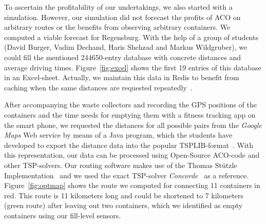 \documentclass[10pt]{article}
\begin{document}
To ascertain the profitability of our undertakings, we also started with a simulation.
However, our simulation did not forecast the profits of ACO on arbitrary routes or the
benefits from observing arbitrary containers. We computed a viable forecast for Regensburg.
With the help of a group of students (David Burger, Vadim Dechand, 
Haris Shehzad and Markus Wildgruber), we could fill the mentioned 
244650-entry database with concrete distances and average driving times. 
Figure~\ref{fig:excel} shows the first 19 entries of this database in an
Excel-sheet. Actually, we maintain this data in Redis to benefit from caching
when the same distances are requested repeatedly~\cite{Carlson13}. 

After accompanying
the waste collectors and recording the GPS positions of the containers and the time needs 
for emptying them with a fitness tracking app on the smart phone, we requested the
distances for all possible pairs from the {\it Google Maps} Web service by means of a 
Java program, which the students have developed to export the distance data into the
popular TSPLIB-format~\cite{tsplib90}. With this representation, our data can be 
processed using Open-Source ACO-code and other TSP-solvers. Our routing software makes
use of the Thomas St{\"u}tzle Implementation~\cite{Dorigo97} and we used the exact 
TSP-solver {\it Concorde}~\cite{applegate01} as a reference. Figure~\ref{fig:optmap}
shows the route we computed for connecting 11 containers in red. This route is 
11 kilometers long and could be shortened to 7 kilometers (green route) after
leaving out two containers, which we identified as empty containers using 
our fill-level sensors.
\end{document}
